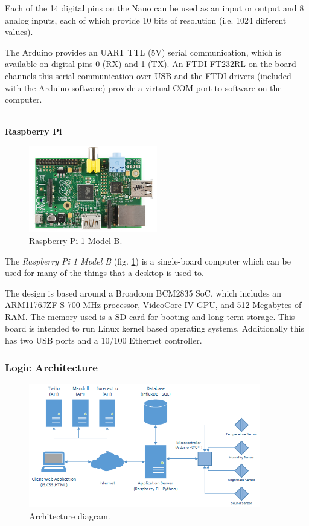 \documentclass[12pt]{report}
\begin{document}
Each of the 14 digital pins on the Nano can be used as an input or output and 8 analog inputs, each of which provide 10 bits of resolution (i.e. 1024 different values). 

The Arduino provides an UART TTL (5V) serial communication, which is available on digital pins 0 (RX) and 1 (TX). An FTDI FT232RL on the board channels this serial communication over USB and the FTDI drivers (included with the Arduino software) provide a virtual COM port to software on the computer. 


\textbf{\\Raspberry Pi}

\begin{figure}[H]
    \centering
    \includegraphics[width=0.5\textwidth]{img/rpi.png}
    \caption{Raspberry Pi 1 Model B.}
    \label{fig:rpi}
\end{figure}

The \textit{Raspberry Pi 1 Model B} (fig. \ref{fig:rpi}) is a single-board computer which can be used for many of the things that a desktop is used to.

The design is based around a Broadcom BCM2835 SoC, which includes an ARM1176JZF-S 700 MHz processor, VideoCore IV GPU, and 512 Megabytes of RAM. The memory used is a SD card for booting and long-term storage. This board is intended to run Linux kernel based operating systems. Additionally this has two USB ports and a 10/100 Ethernet controller.

\subsubsection{Logic Architecture}

\begin{figure}[H]
    \centering
    \includegraphics[width=0.9\textwidth]{arc.png}
    \caption{Architecture diagram.}
    \label{fig:arc}
\end{figure}
\end{document}
